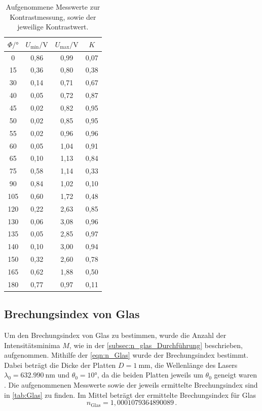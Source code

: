 \begin{table}[H]
  \centering
  \caption{Aufgenommene Messwerte zur Kontrastmessung, sowie der jeweilige Kontrastwert.}
  \label{tab:Kontrast}
  \begin{tabular}{c c c c}
    \toprule
    $\Phi / \si{\degree} $ & $U_{\text{min}} / \si{\volt}$ & $U_{\text{max}} / \si{\volt}$ & $K$ \\
    \midrule
    0     &  0,86  &  0,99  & 0,07  \\
    15    &  0,36  &  0,80  & 0,38  \\
    30    &  0,14  &  0,71  & 0,67  \\
    40    &  0,05  &  0,72  & 0,87  \\
    45    &  0,02  &  0,82  & 0,95  \\
    50    &  0,02  &  0,85  & 0,95  \\
    55    &  0,02  &  0,96  & 0,96  \\
    60    &  0,05  &  1,04  & 0,91  \\
    65    &  0,10  &  1,13  & 0,84  \\
    75    &  0,58  &  1,14  & 0,33  \\
    90    &  0,84  &  1,02  & 0,10  \\
    105   &  0,60  &  1,72  & 0,48  \\
    120   &  0,22  &  2,63  & 0,85  \\
    130   &  0,06  &  3,08  & 0,96  \\
    135   &  0,05  &  2,85  & 0,97  \\
    140   &  0,10  &  3,00  & 0,94  \\
    150   &  0,32  &  2,60  & 0,78  \\
    165   &  0,62  &  1,88  & 0,50  \\
    180   &  0,77  &  0,97  & 0,11  \\
    \bottomrule
  \end{tabular}
\end{table}

\subsection{Brechungsindex von Glas}
\label{subsec:n_Glas}
Um den Brechungsindex von Glas zu bestimmen, wurde die Anzahl der Intensitätsminima $M$, wie in der \autoref{subsec:n_glas_Durchführung} beschrieben, aufgenommen.
Mithilfe der \autoref{eqn:n_Glas} wurde der Brechungsindex bestimmt.
Dabei beträgt die Dicke der Platten $D = \SI{1}{\milli\metre}$, die Wellenlänge des Lasers $\lambda_0 = \SI{632.990}{\nano\metre}$ und $\theta_0 = 10°$, da die beiden Platten jeweils um $\theta_0$ geneigt waren \cite{anleitung}.
Die aufgenommenen Messwerte sowie der jeweils ermittelte Brechungsindex sind in \autoref{tab:Glas} zu finden.
Im Mittel beträgt der ermittelte Brechungsindex für Glas 
\begin{equation*}
    n_\text{Glas} = 1,0001079364890089 \,.
\end{equation*}

